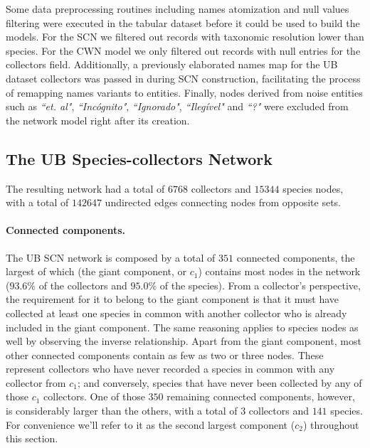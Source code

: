 Some data preprocessing routines including names atomization and null values filtering were executed in the tabular dataset before it could be used to build the models. 
For the SCN we filtered out records with taxonomic resolution lower than species.
For the CWN model we only filtered out records with null entries for the collectors field.
Additionally, a previously elaborated names map for the UB dataset collectors was passed in during SCN construction, facilitating the process of remapping names variants to entities. 
Finally, nodes derived from noise entities such as \textit{``et. al"}, \textit{``Incógnito"}, \textit{``Ignorado"}, \textit{``Ilegível"} and \textit{``?"} were excluded from the network model right after its creation.




\subsection{The UB Species-collectors Network}

The resulting network had a total of $6768$ collectors and $15344$ species nodes, with a total of $142647$ undirected edges connecting nodes from opposite sets. 

\paragraph*{Connected components.}
The UB SCN network is composed by a total of $351$ connected components, the largest of which (the giant component, or $c_1$) contains most nodes in the network ($93.6\%$ of the collectors and $95.0\%$ of the species). 
From a collector's perspective, the requirement for it to belong to the giant component is that it must have collected at least one species in common with another collector who is already included in the giant component. The same reasoning applies to species nodes as well by observing the inverse relationship.
Apart from the giant component, most other connected components contain as few as two or three nodes. These represent collectors who have never recorded a species in common with any collector from $c_1$; and conversely, species that have never been collected by any of those $c_1$ collectors.
One of those $350$ remaining connected components, however, is considerably larger than the others, with a total of $3$ collectors and $141$ species. For convenience we'll refer to it as the second largest component ($c_2$) throughout this section.

